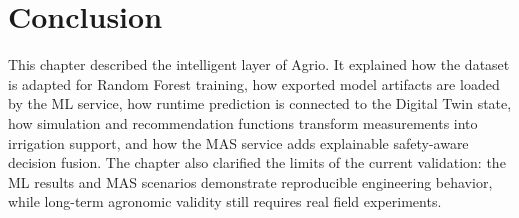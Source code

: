 \section{Conclusion}

This chapter described the intelligent layer of Agrio. It explained how the dataset is adapted for Random Forest training, how exported model artifacts are loaded by the ML service, how runtime prediction is connected to the Digital Twin state, how simulation and recommendation functions transform measurements into irrigation support, and how the MAS service adds explainable safety-aware decision fusion. The chapter also clarified the limits of the current validation: the ML results and MAS scenarios demonstrate reproducible engineering behavior, while long-term agronomic validity still requires real field experiments.
